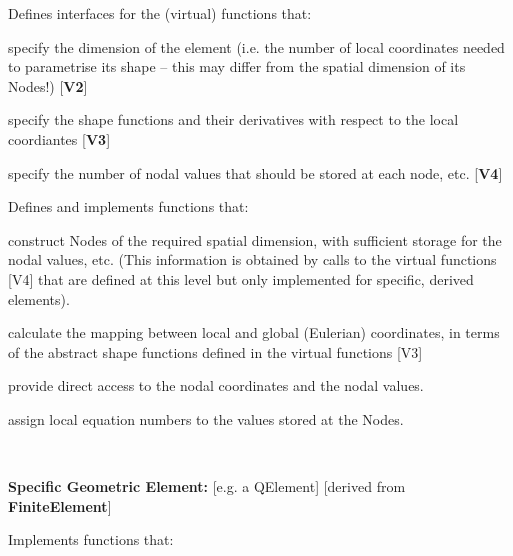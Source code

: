 \begin{center}
\begin{TabularC}{1}
\begin{center}
\begin{TabularC}{1}
\begin{DoxyItemize}
\begin{DoxyItemize}
\end{DoxyItemize}
\item Defines interfaces for the (virtual) functions that\-:
\begin{DoxyItemize}
\item specify the dimension of the element (i.\-e. the number of local coordinates needed to parametrise its shape -- this may differ from the spatial dimension of its {\ttfamily Nodes!}) \mbox{[}{\bfseries V2}\mbox{]}
\item specify the shape functions and their derivatives with respect to the local coordiantes \mbox{[}{\bfseries V3}\mbox{]}
\item specify the number of nodal values that should be stored at each node, etc. \mbox{[}{\bfseries V4}\mbox{]}
\end{DoxyItemize}
\item Defines and implements functions that\-:
\begin{DoxyItemize}
\item construct {\ttfamily Nodes} of the required spatial dimension, with sufficient storage for the nodal values, etc. (This information is obtained by calls to the virtual functions \mbox{[}V4\mbox{]} that are defined at this level but only implemented for specific, derived elements).
\item calculate the mapping between local and global (Eulerian) coordinates, in terms of the abstract shape functions defined in the virtual functions \mbox{[}V3\mbox{]}
\item provide direct access to the nodal coordinates and the nodal values.
\item assign local equation numbers to the values stored at the {\ttfamily Nodes}.   
\end{DoxyItemize}
\end{DoxyItemize}\\
\end{TabularC}
\end{center}  \begin{TabularC}{2}
\hline
\begin{center} {\bfseries Specific Geometric Element\-:} \mbox{[}e.\-g. a {\ttfamily Q\-Element}\mbox{]} \newline
 \mbox{[}derived from {\bfseries Finite\-Element}\mbox{]} \end{center} 
\begin{DoxyItemize}
\item Implements functions that\-:
\begin{DoxyItemize}

\end{DoxyItemize}
\end{DoxyItemize}
\end{TabularC}
\end{TabularC}
\end{center}

